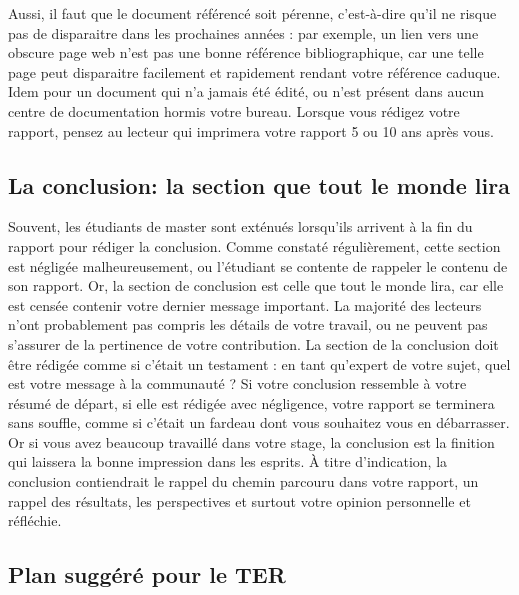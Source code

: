\documentclass{rapport}
\begin{document}
        Aussi, il faut que le document référencé soit pérenne, c'est-à-dire qu'il ne risque pas de disparaitre dans les prochaines années : par exemple, un lien vers une obscure page web n'est pas une bonne référence bibliographique, car une telle page peut disparaitre facilement et rapidement rendant votre référence caduque. Idem pour un document qui n'a jamais été édité, ou n'est présent dans aucun centre de documentation hormis votre bureau. Lorsque vous rédigez votre rapport, pensez au lecteur qui imprimera votre rapport  5 ou 10 ans après vous. 
 
      \subsection{La conclusion: la section que tout le monde lira} 
        Souvent, les étudiants de master sont exténués lorsqu'ils arrivent à la fin du rapport pour rédiger la conclusion. Comme constaté régulièrement, cette section est négligée malheureusement, ou l'étudiant se contente de rappeler le contenu de son rapport. Or, la section de conclusion est celle que tout le monde lira, car elle est censée contenir votre dernier message important. La majorité des lecteurs n'ont probablement pas compris les détails de votre travail, ou ne peuvent pas s'assurer de la pertinence de votre contribution. La section de la conclusion doit être rédigée comme si c'était un testament : en tant qu'expert de votre sujet, quel est votre message à la communauté ? Si votre conclusion ressemble à votre résumé de départ, si elle est rédigée avec négligence, votre rapport se terminera sans souffle, comme si c'était un fardeau dont vous souhaitez vous en débarrasser. Or si vous avez beaucoup travaillé dans votre stage, la conclusion est la finition qui laissera la bonne impression dans les esprits. À titre d'indication, la conclusion contiendrait le rappel du chemin parcouru dans votre rapport, un rappel des résultats, les perspectives et surtout votre opinion personnelle et réfléchie.
        
      \subsection{Plan suggéré pour le TER}
        
\end{document}
